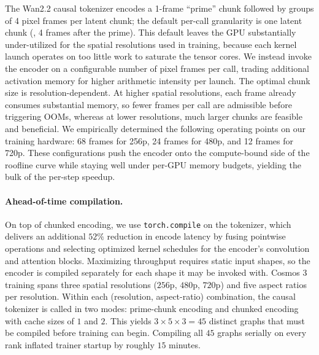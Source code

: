 The Wan2.2 causal tokenizer encodes a 1-frame ``prime'' chunk followed by groups of 4 pixel frames per latent chunk; the default per-call granularity is one latent chunk (\ie, 4 frames after the prime). This default leaves the GPU substantially under-utilized for the spatial resolutions used in training, because each kernel launch operates on too little work to saturate the tensor cores. We instead invoke the encoder on a configurable number of pixel frames per call, trading additional activation memory for higher arithmetic intensity per launch. The optimal chunk size is resolution-dependent. At higher spatial resolutions, each frame already consumes substantial memory, so fewer frames per call are admissible before triggering OOMs, whereas at lower resolutions, much larger chunks are feasible and beneficial. We empirically determined the following operating points on our training hardware: 68 frames for 256p, 24 frames for 480p, and 12 frames for 720p. These configurations push the encoder onto the compute-bound side of the roofline curve while staying well under per-GPU memory budgets, yielding the bulk of the per-step speedup.

\paragraph{Ahead-of-time compilation.}



On top of chunked encoding, we use \texttt{torch.compile} on the tokenizer, which delivers an additional $52\%$ reduction in encode latency by fusing pointwise operations and selecting optimized kernel schedules for the encoder's convolution and attention blocks. Maximizing throughput requires static input shapes, so the encoder is compiled separately for each shape it may be invoked with. Cosmos 3 training spans three spatial resolutions ($256\text{p}$, $480\text{p}$, $720\text{p}$) and five aspect ratios per resolution. Within each (resolution, aspect-ratio) combination, the causal tokenizer is called in two modes: prime-chunk encoding and chunked encoding with cache sizes of $1$ and $2$. This yields $3 \times 5 \times 3 = 45$ distinct graphs that must be compiled before training can begin. Compiling all $45$ graphs serially on every rank inflated trainer startup by roughly $15$ minutes.


